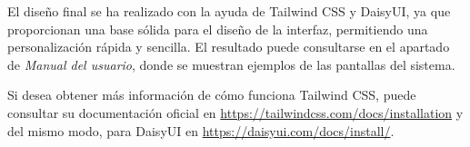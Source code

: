 






El diseño final se ha realizado con la ayuda de Tailwind CSS y DaisyUI, ya que proporcionan una base sólida para el
diseño de la interfaz, permitiendo una personalización rápida y sencilla.
El resultado puede consultarse en el apartado de \textit{Manual del usuario}, donde se muestran ejemplos de las
pantallas del sistema.

Si desea obtener más información de cómo funciona Tailwind CSS, puede consultar su documentación oficial en
\url{https://tailwindcss.com/docs/installation} y del mismo modo, para DaisyUI en
\url{https://daisyui.com/docs/install/}.